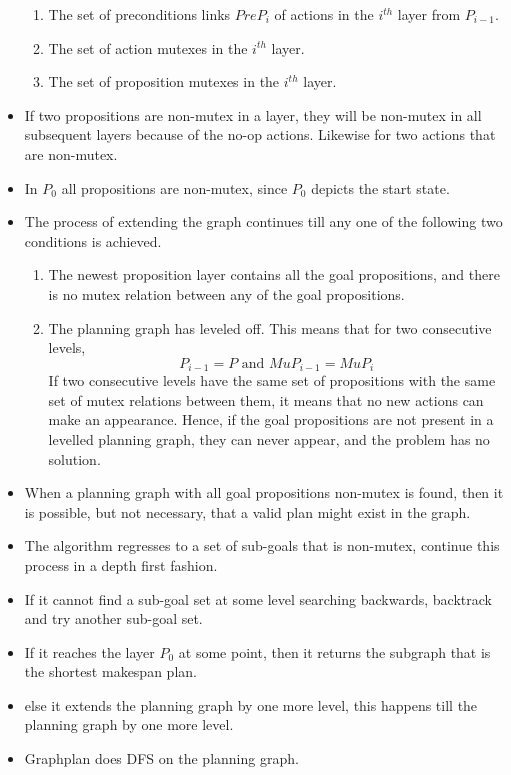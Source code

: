 \documentclass[a4paper]{article}
\begin{document}
\begin{itemize}
\begin{enumerate}
        \item The set of preconditions links $PreP_i$ of actions in the $i^{th}$ layer from $P_{i-1}$.
        \item The set of action mutexes in the $i^{th}$ layer.
        \item The set of proposition mutexes in the $i^{th}$ layer.
    \end{enumerate}
    \item If two propositions are non-mutex in a layer, they will be non-mutex in all subsequent layers because of the no-op actions. Likewise for two actions that are non-mutex.
    \item In $P_0$ all propositions are non-mutex, since $P_0$ depicts the start state.
    \item The process of extending the graph continues till any one of the following two conditions is achieved.
    \begin{enumerate}
        \item The newest proposition layer contains all the goal propositions, and there is no mutex relation between any of the goal propositions.
        \item The planning graph has leveled off. This means that for two consecutive levels,
        \begin{equation*}
            P_{i-1}=P\text{ and }MuP_{i-1}=MuP_i
        \end{equation*}
        If two consecutive levels have the same set of propositions with the same set of mutex relations between them, it means that no new actions can make an appearance. Hence, if the goal propositions are not present in a levelled planning graph, they can never appear, and the problem has no solution.
    \end{enumerate}
    \item When a planning graph with all goal propositions non-mutex is found, then it is possible, but not necessary, that a valid plan might exist in the graph.
    \item The algorithm regresses to a set of sub-goals that is non-mutex, continue this process in a depth first fashion.
    \item If it cannot find a sub-goal set at some level searching backwards, backtrack and try another sub-goal set.
    \item If it reaches the layer $P_0$ at some point, then it returns the subgraph that is the shortest makespan plan.
    \item else it extends the planning graph by one more level, this happens till the planning graph by one more level.
    \item Graphplan does DFS on the planning graph.
\end{itemize}
\end{document}
